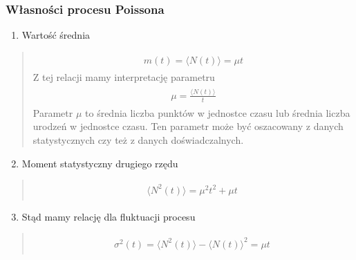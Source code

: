 \documentclass[a4paper,12pt,polish]{sphinxmanual}
\begin{document}
\subsubsection{Własności procesu Poissona}
\label{ch3/chIII021:wlasnosci-procesu-poissona}\begin{enumerate}
\item {} 
Wartość średnia

\end{enumerate}
\begin{quote}
\label{ch3/chIII021:equation-eqn25}\begin{gather}
\begin{split}m(t) = \langle N(t) \rangle = \mu t\end{split}\label{ch3/chIII021-eqn25}
\end{gather}
Z tej relacji mamy interpretację parametru
\label{ch3/chIII021:equation-eqn26}\begin{gather}
\begin{split}\mu = \frac{\langle N(t) \rangle}{t}\end{split}\label{ch3/chIII021-eqn26}
\end{gather}
Parametr $\mu$ to średnia liczba punktów w jednostce czasu lub średnia liczba urodzeń w jednostce czasu. Ten parametr może być
oszacowany z danych statystycznych czy też z danych doświadczalnych.
\end{quote}
\begin{enumerate}
\setcounter{enumi}{1}
\item {} 
Moment statystyczny drugiego rzędu

\end{enumerate}
\begin{quote}
\label{ch3/chIII021:equation-eqn27}\begin{gather}
\begin{split}\langle N^2(t) \rangle = \mu^2 t^2 + \mu t\;\end{split}\label{ch3/chIII021-eqn27}
\end{gather}\end{quote}
\begin{enumerate}
\setcounter{enumi}{2}
\item {} 
Stąd mamy relację dla fluktuacji procesu

\end{enumerate}
\begin{quote}
\label{ch3/chIII021:equation-eqn28}\begin{gather}
\begin{split}\sigma^2(t) = \langle N^2(t) \rangle - \langle N(t) \rangle^2 = \mu t \;\end{split}\label{ch3/chIII021-eqn28}
\end{gather}\end{quote}
\end{document}
